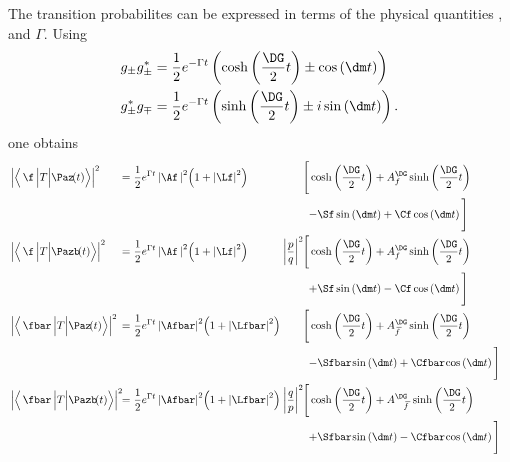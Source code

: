 The transition probabilites can be expressed in terms of the physical quantities \dm, \DG and $\Gamma$.
Using
\begin{align}
g_{\pm}g_{\pm}^{*} &= \frac{1}{2}e^{-\Gamma t}\left(\cosh\left(\frac{\DG}{2}t\right)\pm\cos\left(\dm t\right)\right)\\
g_{\pm}^*g_{\mp} &=  \frac{1}{2}e^{-\Gamma t}\left(\sinh\left(\frac{\DG}{2}t\right)\pm i\sin\left(\dm t\right)\right).
\end{align}
one obtains
\begin{align}
&\left|\left<\,\f\,\Big|T\Big|\Paz\!(t)\right>\right|^2\!\!&\kern -7.5pt{=}
&\kern 3pt {\frac{1}{2}e^{\Gamma t}\left|\Af\,\right|^2\!\left(1+\left|\Lf\right|^2\right)}& &&
&\kern -10.5pt{\Bigg[\cosh\left(\frac{\DG}{2}t\right) + A_f^{\DG}\sinh\left(\frac{\DG}{2}t\right)}&\nonumber\\
&& && && &\kern -5pt{-\Sf\sin\left(\dm t\right)+\Cf\cos\left(\dm t\right)\Bigg]}&\\
&\left|\left<\,\f\,\Big|T\Big|\Pazb\!(t)\right>\right|^2\!\!&\kern -7.5pt{=}
&\kern 3pt {\frac{1}{2}e^{\Gamma t}\left|\Af\,\right|^2\!\left(1+\left|\Lf\right|^2\right)}& &\kern -7.5pt{\left|\frac{p}{q}\right|^2}&
&\kern -10.5pt{\Bigg[\cosh\left(\frac{\DG}{2}t\right) + A_f^{\DG}\sinh\left(\frac{\DG}{2}t\right)}&\nonumber\\
&& && && &\kern -5pt{+\Sf\sin\left(\dm t\right)-\Cf\cos\left(\dm t\right)\Bigg]}&\\
&\left|\left<\,\fbar\,\Big|T\Big|\Paz\!(t)\right>\right|^2\!\!&\kern -7.5pt{=}
&\kern 3pt {\frac{1}{2}e^{\Gamma t}\left|\Afbar\right|^2\!\left(1+\left|\Lfbar\right|^2\right)}& &&
&\kern -10.5pt{\Bigg[\cosh\left(\frac{\DG}{2}t\right) + A_{\kern 1.5pt\overline{\kern -1.5pt f\kern 1.5pt}}^{\DG}\sinh\left(\frac{\DG}{2}t\right)}&\nonumber\\
&& && && &\kern -5pt{-\Sfbar\kern -0.1em\sin\left(\dm t\right)+\Cfbar\kern -0.1em\cos\left(\dm t\right)\Bigg]}&\\
&\left|\left<\,\fbar\,\Big|T\Big|\Pazb\!(t)\right>\right|^2\!\!&\kern -7.5pt{=}
&\kern 3pt {\frac{1}{2}e^{\Gamma t}\left|\Afbar\right|^2\!\left(1+\left|\Lfbar\right|^2\right)}& &\kern -7.5pt{\left|\frac{q}{p}\right|^2}&
&\kern -10.5pt{\Bigg[\cosh\left(\frac{\DG}{2}t\right) + A_{\kern 9.5pt\overline{\kern -1.5pt f\kern 1.5pt}}^{\DG}\sinh\left(\frac{\DG}{2}t\right)}&\nonumber\\
&& && && &\kern -5pt{+\Sfbar\kern -0.1em \sin\left(\dm t\right)-\Cfbar\kern -0.1em\cos\left(\dm t\right)\Bigg]}&
\end{align}
